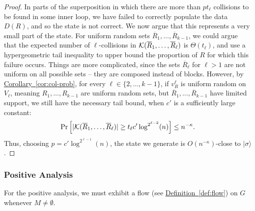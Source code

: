\documentclass{article}
\newcommand{\cor}[1]{\hyperref[cor:#1]{Corollary~\ref*{cor:#1}}}
\newcommand{\defin}[1]{\hyperref[def:#1]{Definition~\ref*{def:#1}}}
\def\ket#1{{\lvert}#1\rangle}
\renewcommand{\>}{\rangle}
\newcommand{\<}{\langle}
\renewcommand{\(}{\left(}
\renewcommand{\)}{\right)}
\begin{document}
\begin{proof}
In parts of the superposition in which there are more than $pt_{\ell}$ collisions to be found in some inner loop, we have failed to correctly populate the data $D(R)$, and so the state is not correct. We now argue that this represents a very small part of the state. For uniform random sets $\overline{R}_1,\dots,\overline{R}_{k-1}$, we could argue that the expected number of $\ell$-collisions in ${\cal K}(\overline{R}_1,\dots,\overline{R}_{\ell})$ is $\Theta(t_{\ell})$, and use a hypergeometric tail inequality to upper bound the proportion of $R$ for which this failure occurs. Things are more complicated, since the sets $\overline{R}_{\ell}$ for $\ell>1$ are not uniform on all possible sets -- they are composed instead of blocks. However, by \cor{col-prob}, for every $\ell\in \{2,\dots,k-1\}$, if $v_R^{\ell}$ is uniform random on $V_{\ell}$, meaning $R_1,\dots,R_{k-1}$ are uniform random sets, but $\overline{R}_1,\dots,\overline{R}_{k-1}$ have limited support, we still have the necessary tail bound, when $c'$ is a sufficiently large constant: 
	$$\Pr\left[|{\cal K}(\overline{R}_1,\dots,\overline{R}_{\ell})|\geq t_{\ell}c'\log^{2^{\ell-2}}(n)\right]\leq n^{-\kappa}.$$
Thus, choosing $p=c'\log^{2^{\ell-1}}(n)$, the state we generate is $O(n^{-\kappa})$-close to $\ket{\sigma}$.
\end{proof}


 \subsubsection{Positive Analysis}

For the positive analysis, we must exhibit a flow (see \defin{flow}) on $G$ whenever $M\neq \emptyset$. 
\end{document}
